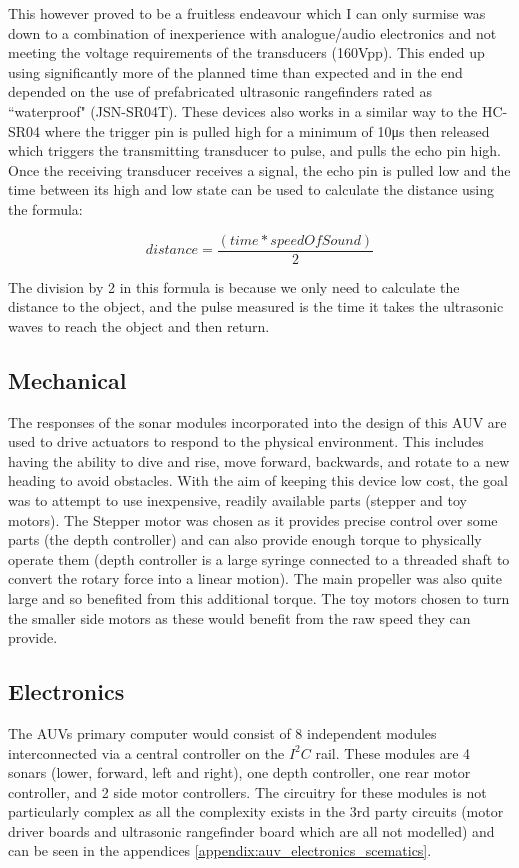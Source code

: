 \documentclass[11pt,a4paper,titlepage]{report}
\begin{document}
	This however proved to be a fruitless endeavour which I can only surmise was down to a combination of inexperience with analogue/audio electronics and not meeting the voltage requirements of the transducers (160\unit{\volt}pp). This ended up using significantly more of the planned time than expected and in the end depended on the use of prefabricated ultrasonic rangefinders rated as ``waterproof" (JSN-SR04T\cite{JSN_SR04T}). These devices also works in a similar way to the HC-SR04\cite{HC_SR04} where the trigger pin is pulled high for a minimum of 10\unit{\micro\second} then released which triggers the transmitting transducer to pulse, and pulls the echo pin high. Once the receiving transducer receives a signal, the echo pin is pulled low and the time between its high and low state can be used to calculate the distance using the formula:
	
	$$
	distance = \frac{(time * speedOfSound)}{2}
	$$	
	
	The division by 2 in this formula is because we only need to calculate the distance to the object, and the pulse measured is the time it takes the ultrasonic waves to reach the object and then return.
	
	\subsection*{Mechanical}
	The responses of the sonar modules incorporated into the design of this AUV are used to drive actuators to respond to the physical environment. This includes having the ability to dive and rise, move forward, backwards, and rotate to a new heading to avoid obstacles. With the aim of keeping this device low cost, the goal was to attempt to use inexpensive, readily available parts (stepper and toy motors). The Stepper motor was chosen as it provides precise control over some parts (the depth controller) and can also provide enough torque to physically operate them (depth controller is a large syringe connected to a threaded shaft to convert the rotary force into a linear motion). The main propeller was also quite large and so benefited from this additional torque. The toy motors chosen to turn the smaller side motors as these would benefit from the raw speed they can provide. 
	
	\subsection*{Electronics}
	The AUVs primary computer would consist of 8 independent modules interconnected via a central controller on the $I^{2}C$ rail. These modules are 4 sonars (lower, forward, left and right), one depth controller, one rear motor controller, and 2 side motor controllers. The circuitry for these modules is not particularly complex as all the complexity exists in the 3rd party circuits (motor driver boards and ultrasonic rangefinder board which are all not modelled) and can be seen in the appendices \ref{appendix:auv_electronics_scematics}.
	
\end{document}
